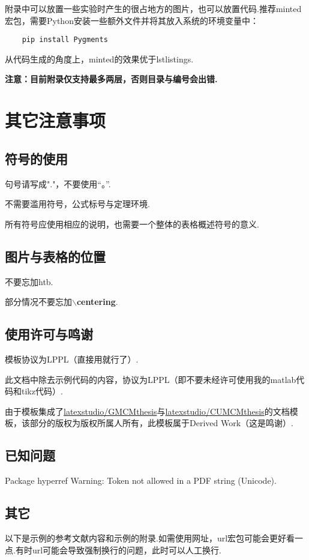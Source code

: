 \documentclass[bwprint, withouttitlepage]{mathexpthesis}
\begin{document}
附录中可以放置一些实验时产生的很占地方的图片，也可以放置代码.推荐minted宏包，需要Python安装一些额外文件并将其放入系统的环境变量中：
\begin{verbatim}
    pip install Pygments
\end{verbatim}

从代码生成的角度上，minted的效果优于lstlistings.

\textbf{注意：目前附录仅支持最多两层，否则目录与编号会出错.}

\section{其它注意事项}
\subsection{符号的使用}
句号请写成"."，不要使用“。”.

不需要滥用符号，公式标号与定理环境.

所有符号应使用相应的说明，也需要一个整体的表格概述符号的意义.

\subsection{图片与表格的位置}
不要忘加htb.

部分情况不要忘加$\backslash$\textbf{centering}.

\subsection{使用许可与鸣谢}
模板协议为LPPL（直接用就行了）.

此文档中除去示例代码的内容，协议为LPPL（即不要未经许可使用我的matlab代码和tikz代码）.

由于模板集成了\href{https://github.com/latexstudio/GMCMthesis}{latexstudio/GMCMthesis}与\href{https://github.com/latexstudio/CUMCMthesis}{latexstudio/CUMCMthesis}的文档模板，该部分的版权为版权所属人所有，此模板属于Derived Work（这是鸣谢）.

\subsection{已知问题}
Package hyperref Warning: Token not allowed in a PDF string (Unicode).

\subsection{其它}
以下是示例的参考文献内容和示例的附录.如需使用网址，url宏包可能会更好看一点.有时url可能会导致强制换行的问题，此时可以人工换行.
\end{document}
